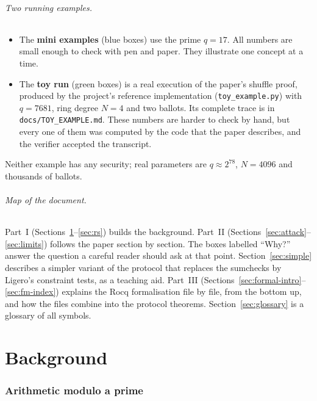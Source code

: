 \documentclass[11pt,a4paper]{article}
\theoremstyle{definition}
\theoremstyle{plain}
\begin{document}
\paragraph{Two running examples.}
\begin{itemize}[leftmargin=1.3em]
\item The \textbf{mini examples} (blue boxes) use the prime $q=17$. All numbers are small enough to
  check with pen and paper. They illustrate one concept at a time.
\item The \textbf{toy run} (green boxes) is a real execution of the paper's shuffle proof, produced
  by the project's reference implementation (\texttt{toy\_example.py}) with $q=7681$, ring degree
  $N=4$ and two ballots. Its complete trace is in \texttt{docs/TOY\_EXAMPLE.md}. These numbers are
  harder to check by hand, but every one of them was computed by the code that the paper describes,
  and the verifier accepted the transcript.
\end{itemize}
Neither example has any security; real parameters are $q\approx 2^{78}$, $N=4096$ and thousands
of ballots.

\paragraph{Map of the document.}
Part~I (Sections~\ref{sec:modular}--\ref{sec:rs}) builds the background. Part~II
(Sections~\ref{sec:attack}--\ref{sec:limits}) follows the paper section by section. The boxes
labelled ``Why?'' answer the question a careful reader should ask at that point. Section~\ref{sec:simple} describes a simpler variant of the protocol that replaces the
sumchecks by Ligero's constraint tests, as a teaching aid. Part~III
(Sections~\ref{sec:formal-intro}--\ref{sec:fm-index}) explains the Rocq formalisation file by file,
from the bottom up, and how the files combine into the protocol theorems. Section~\ref{sec:glossary}
is a glossary of all symbols.

\part{Background}

\section{Arithmetic modulo a prime}
\label{sec:modular}
\end{document}
